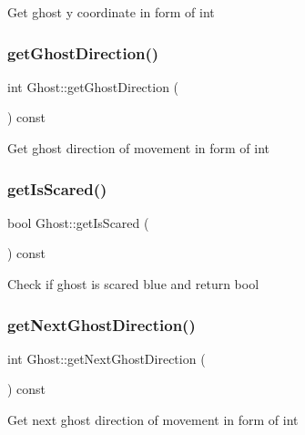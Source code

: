 Get ghost y coordinate in form of int \mbox{\label{class_ghost_a3e8e504b59439d1fac4a72c2f55839c4}} 
\subsubsection{\texorpdfstring{get\+Ghost\+Direction()}{getGhostDirection()}}
{\footnotesize\ttfamily int Ghost\+::get\+Ghost\+Direction (\begin{DoxyParamCaption}{ }\end{DoxyParamCaption}) const\hspace{0.3cm}{\ttfamily [inline]}}

Get ghost direction of movement in form of int \mbox{\label{class_ghost_a36454848ec5fc01511d6d0a2ab81e21b}} 
\subsubsection{\texorpdfstring{get\+Is\+Scared()}{getIsScared()}}
{\footnotesize\ttfamily bool Ghost\+::get\+Is\+Scared (\begin{DoxyParamCaption}{ }\end{DoxyParamCaption}) const\hspace{0.3cm}{\ttfamily [inline]}}

Check if ghost is scared blue and return bool \mbox{\label{class_ghost_a79c2a1a910758ead53489ab220c0bb3a}} 
\subsubsection{\texorpdfstring{get\+Next\+Ghost\+Direction()}{getNextGhostDirection()}}
{\footnotesize\ttfamily int Ghost\+::get\+Next\+Ghost\+Direction (\begin{DoxyParamCaption}{ }\end{DoxyParamCaption}) const\hspace{0.3cm}{\ttfamily [inline]}}

Get next ghost direction of movement in form of int \mbox{\label{class_ghost_a052109c06bca7263f6bd0ccc963d5c48}} 
